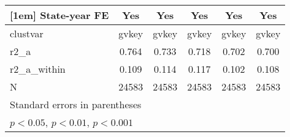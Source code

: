 {\begin{tabular}{l*{5}{c}}
[1em]
State-year FE&         Yes         &         Yes         &         Yes         &         Yes         &         Yes         \\
\hline
clustvar    &       gvkey         &       gvkey         &       gvkey         &       gvkey         &       gvkey         \\
r2\_a        &       0.764         &       0.733         &       0.718         &       0.702         &       0.700         \\
r2\_a\_within &       0.109         &       0.114         &       0.117         &       0.102         &       0.108         \\
N           &       24583         &       24583         &       24583         &       24583         &       24583         \\
\hline\hline
\multicolumn{6}{l}{\footnotesize Standard errors in parentheses}\\
\multicolumn{6}{l}{\footnotesize \sym{*} \(p<0.05\), \sym{**} \(p<0.01\), \sym{***} \(p<0.001\)}\\
\end{tabular}
}
